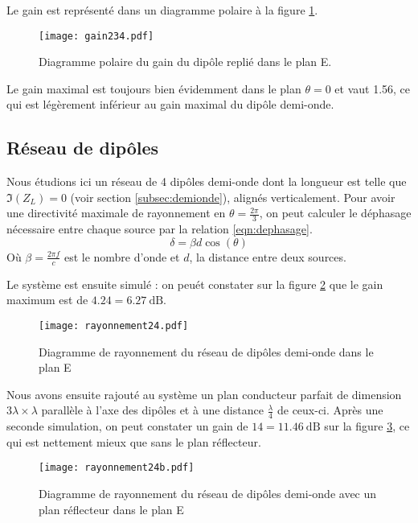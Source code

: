 Le gain est représenté dans un diagramme polaire à la figure \ref{fig:gain234}.
\begin{figure}[htbp]
  \centering
  \texttt{[image: gain234.pdf]}
  \caption{Diagramme polaire du gain du dipôle replié dans le plan E.\label{fig:gain234}}
\end{figure}
Le gain maximal est toujours bien évidemment dans le plan $\theta = 0$ et vaut \num{1.56}, ce qui est légèrement inférieur au gain maximal du dipôle demi-onde.

\subsection{Réseau de dipôles}
Nous étudions ici un réseau de 4 dipôles demi-onde dont la longueur est telle que $\Im(Z_L)=0$ (voir section \ref{subsec:demionde}), alignés verticalement. Pour avoir une directivité maximale de rayonnement en $\theta=\frac{2\pi}{3}$, on peut calculer le déphasage nécessaire entre chaque source par la relation \ref{eqn:dephasage}.
\begin{equation}\label{eqn:dephasage}
\delta = \beta d \cos(\theta)
\end{equation}
Où $\beta = \frac{2\pi f}{c}$ est le nombre d'onde et $d$, la distance entre deux sources.

Le système est ensuite simulé : on peuét constater sur la figure \ref{fig:rayonnement4} que le gain maximum est de $\num{4.24} = \SI{6.27}{\deci\bel}$.
\begin{figure}[htbp]
  \centering
  \texttt{[image: rayonnement24.pdf]}
  \caption{Diagramme de rayonnement du réseau de dipôles demi-onde dans le plan E\label{fig:rayonnement4}}
\end{figure}

Nous avons ensuite rajouté au système un plan conducteur parfait de dimension $3\lambda \times \lambda$ parallèle à l'axe des dipôles et à une distance $\frac{\lambda}{4}$ de ceux-ci. Après une seconde simulation, on peut constater un gain de $\num{14} = \SI{11.46}{\deci\bel}$ sur la figure \ref{fig:rayonnement4reflecteur}, ce qui est nettement mieux que sans le plan réflecteur.
\begin{figure}[htbp]
  \centering
  \texttt{[image: rayonnement24b.pdf]}
  \caption{Diagramme de rayonnement du réseau de dipôles demi-onde avec un plan réflecteur dans le plan E\label{fig:rayonnement4reflecteur}}
\end{figure}

